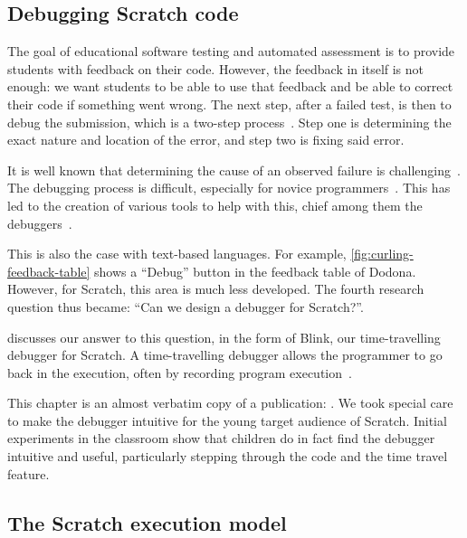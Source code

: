 \documentclass[../main]{subfiles}
\begin{document}
\subsection{Debugging Scratch code}\label{subsec:debugging-scratch-code}

The goal of educational software testing and automated assessment is to provide students with feedback on their code.
However, the feedback in itself is not enough: we want students to be able to use that feedback and be able to correct their code if something went wrong.
The next step, after a failed test, is then to debug the submission, which is a two-step process~\autocite{myersArtSoftwareTesting2012}.
Step one is determining the exact nature and location of the error, and step two is fixing said error.

It is well known that determining the cause of an observed failure is challenging~\autocite{ammannIntroductionSoftwareTesting2016}.
The debugging process is difficult, especially for novice programmers~\autocite{mccauleyDebuggingReviewLiterature2008}.
This has led to the creation of various tools to help with this, chief among them the debuggers~\autocite{rosenbergHowDebuggersWork1996}.

This is also the case with text-based languages.
For example, \cref{fig:curling-feedback-table} shows a ``Debug'' button in the feedback table of Dodona.
However, for Scratch, this area is much less developed.
The fourth research question thus became: ``Can we design a debugger for Scratch?''.

 discusses our answer to this question, in the form of Blink, our time-travelling debugger for Scratch.
A time-travelling debugger allows the programmer to go back in the execution, often by recording program execution~\autocite{barrTardisAffordableTimetravel2014,barrTimetravelDebuggingJavaScript2016,czaplickiAsynchronousFunctionalReactive2013,balzerEXDAMSExtendableDebugging1969,ungarDebuggingExperienceImmediacy1997,chenReversibleDebuggingUsing2001,crescenziReversibleExecutionVisualization2000}.

This chapter is an almost verbatim copy of a publication: \textcite{strijbolBlinkEducationalSoftware2024}.
We took special care to make the debugger intuitive for the young target audience of Scratch.
Initial experiments in the classroom show that children do in fact find the debugger intuitive and useful, particularly stepping through the code and the time travel feature.

\subsection{The Scratch execution model}\label{subsec:the-scratch-execution-model}
\end{document}
